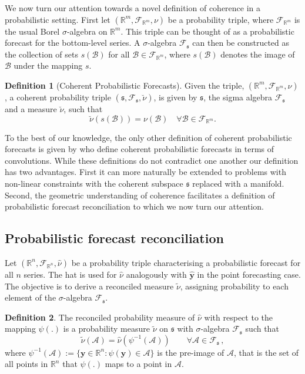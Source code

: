 \documentclass[12pt]{article}
\theoremstyle{definition}
\newtheorem{definition}{Definition}[section]
\begin{document}
We now turn our attention towards a novel definition of coherence in a probabilistic setting.  First let $(\mathbb{R}^m, \mathscr{F}_{\mathbb{R}^m}, \nu)$ be a probability triple, where $\mathscr{F}_{\mathbb{R}^m}$ is the usual Borel $\sigma$-algebra on $\mathbb{R}^m$. This triple can be thought of as a probabilistic forecast for the bottom-level series.  A $\sigma$-algebra $\mathscr{F}_{\mathfrak{s}}$ can then be constructed as the collection of sets $s(\mathcal{B})$ for all $\mathcal{B}\in \mathscr{F}_{\mathbb{R}^m}$, where $s(\mathcal{B})$ denotes the image of $\mathcal{B}$ under the mapping $s$.

\begin{definition}[Coherent Probabilistic Forecasts]\label{def:cohprob}
	Given the triple, $(\mathbb{R}^m, \mathscr{F}_{\mathbb{R}^m}, \nu)$, a coherent probability triple $(\mathfrak{s}, \mathscr{F}_{\mathfrak{s}}, \breve{\nu})$, is given by $\mathfrak{s}$, the sigma algebra $\mathscr{F}_{\mathfrak{s}}$ and a measure $\breve{\nu}$, such that
	\[
	\breve{\nu}(s(\mathcal{B})) = \nu(\mathcal{B}) \quad \forall \mathcal{B} \in \mathscr{F}_{\mathbb{R}^m}.
	\]
\end{definition}

To the best of our knowledge, the only other definition of coherent probabilistic forecasts is given by \citet{BenTaieb2017} who define coherent probabilistic forecasts in terms of convolutions. While these definitions do not contradict one another our definition has two advantages.  First it can more naturally be extended to problems with non-linear constraints with the coherent subspace $\mathfrak{s}$ replaced with a manifold.  Second, the geometric understanding of coherence facilitates a definition of probabilistic forecast reconciliation to which we now turn our attention.

\subsection{Probabilistic forecast reconciliation} \label{subsec:ProbForecastRecon}

Let $(\mathbb{R}^n, \mathscr{F}_{\mathbb{R}^n}, \hat{\nu})$ be a probability triple characterising a probabilistic forecast for all $n$ series. The hat is used for $\hat{\nu}$ analogously with $\hat{\bm y}$ in the point forecasting case.  The objective is to derive a reconciled measure $\tilde{\nu}$, assigning probability to each element of the $\sigma$-algebra $\mathscr{F}_\mathfrak{s}$.

\begin{definition} \label{def:reconprob}
	The reconciled probability measure of $\hat{\nu}$ with respect to the mapping $\psi(.)$ is a probability measure $\tilde{\nu}$ on $\mathfrak{s}$ with $\sigma$-algebra $\mathscr{F}_\mathfrak{s}$ such that
	\[
	\tilde{\nu}(\mathcal{A}) =  \hat{\nu}(\psi^{-1}(\mathcal{A})) \qquad \forall \mathcal{A} \in \mathscr{F}_{\mathfrak{s}}\,,
	\]
	where $\psi^{-1}(\mathcal{A}):=\{{\bm{y}}\in \mathbb{R}^n:\psi({\bm{y}})\in \mathcal{A}\}$ is the pre-image of $\mathcal{A}$, that is the set of all points in $\mathbb{R}^n$ that $\psi(.)$ maps to a point in $\mathcal{A}$.
\end{definition}
\end{document}
